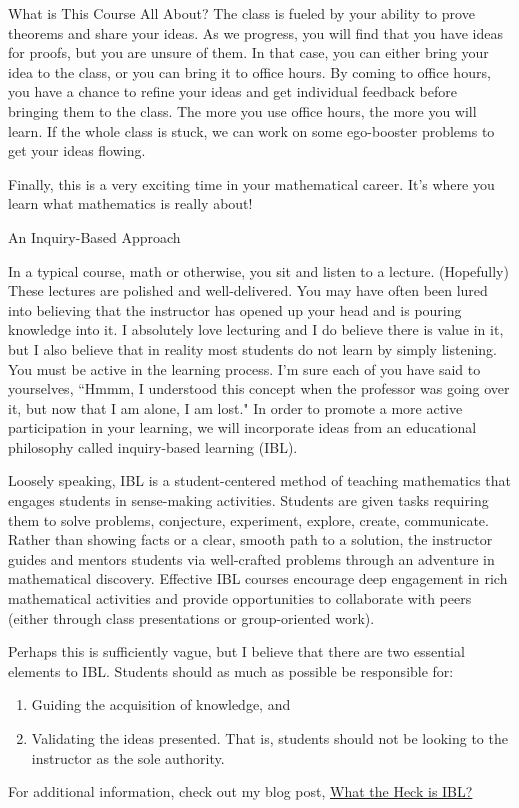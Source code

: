 \begin{section}{What is This Course All About?}
The class is fueled by your ability to prove theorems and share your ideas.  As we progress, you will find that you have ideas for proofs, but you are unsure of them.  In that case, you can either bring your idea to the class, or you can bring it to office hours.  By coming to office hours, you have a chance to refine your ideas and get individual feedback before bringing them to the class.  The more you use office hours, the more you will learn.  If the whole class is stuck, we can work on some ego-booster problems to get your ideas flowing.

Finally, this is a very exciting time in your mathematical career.  It's where you learn what mathematics is really about!

\end{section}

\begin{section}{An Inquiry-Based Approach}

In a typical course, math or otherwise, you sit and listen to a lecture. (Hopefully) These lectures are polished and well-delivered. You may have often been lured into believing that the instructor has opened up your head and is pouring knowledge into it. I absolutely love lecturing and I do believe there is value in it, but I also believe that in reality most students do not learn by simply listening. You must be active in the learning process. I'm sure each of you have said to yourselves, ``Hmmm, I understood this concept when the professor was going over it, but now that I am alone, I am lost." In order to promote a more active participation in your learning, we will incorporate ideas from an educational philosophy called inquiry-based learning (IBL).

Loosely speaking, IBL is a student-centered method of teaching mathematics that engages students in sense-making activities.  Students are given tasks requiring them to solve problems, conjecture, experiment, explore, create, communicate.  Rather than showing facts or a clear, smooth path to a solution, the instructor guides and mentors students via well-crafted problems through an adventure in mathematical discovery.  Effective IBL courses encourage deep engagement in rich mathematical activities and provide opportunities to collaborate with peers (either through class presentations or group-oriented work).

Perhaps this is sufficiently vague, but I believe that there are two essential elements to IBL.  Students should as much as possible be responsible for:
\begin{enumerate}
\item Guiding the acquisition of knowledge, and
\item Validating the ideas presented.  That is, students should not be looking to the instructor as the sole authority.
\end{enumerate}
\noindent For additional information, check out my blog post, \href{http://maamathedmatters.blogspot.com/2013/05/what-heck-is-ibl.html}{What the Heck is IBL?}


\end{section}
